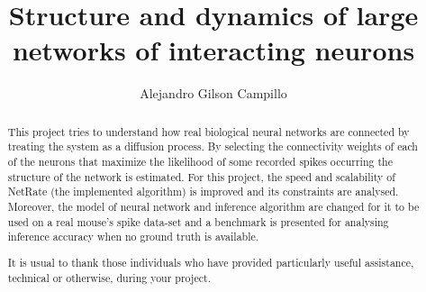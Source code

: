 \documentclass[a4paper, twoside]{report}
\title{Structure and dynamics of large networks of interacting neurons}
\author{Alejandro Gilson Campillo}
\begin{document}


\begin{abstract}
This project tries to understand how real biological neural networks are connected by treating the system as a diffusion process. By selecting the connectivity weights of each of the neurons that maximize the likelihood of some recorded spikes occurring  the structure of the network is estimated. For this project, the speed and scalability of NetRate (the implemented algorithm) is improved and its constraints are analysed. Moreover, the model of neural network and inference algorithm are changed for it to be used on a real mouse’s spike data-set and a benchmark is presented for analysing inference accuracy when no ground truth is available.
\end{abstract}

\renewcommand{\abstractname}{Acknowledgements}
\begin{abstract}
It is usual to thank those individuals who have provided particularly useful assistance, technical or otherwise, during your project.
\end{abstract}

\tableofcontents
\listoffigures
\listoftables











\printbibliography 
% 
% 
\end{document}
